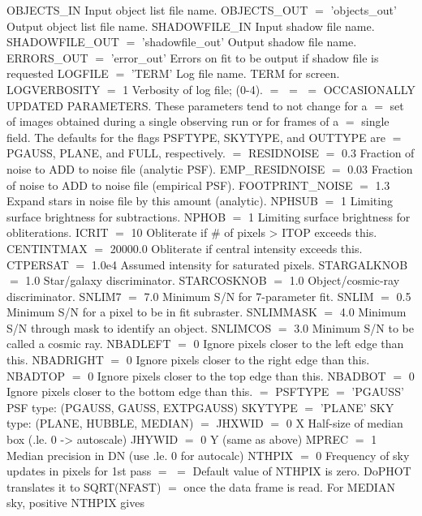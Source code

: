 {{OBJECTS\_IN                           Input object list file name.
OBJECTS\_OUT $=$ 'objects\_out'          Output object list file name.
SHADOWFILE\_IN                        Input shadow file name.
SHADOWFILE\_OUT $=$ 'shadowfile\_out'    Output shadow file name.
ERRORS\_OUT $=$ 'error\_out'  Errors on fit to be output if shadow file is requested
LOGFILE $=$ 'TERM'                     Log file name.  TERM for screen.
LOGVERBOSITY $=$ 1                     Verbosity of log file; (0-4).
$=$
$=$
$=$  OCCASIONALLY UPDATED PARAMETERS.  These parameters tend to not change for a
$=$  set of images obtained during a single observing run or for frames of a
$=$  single field.  The defaults for the flags PSFTYPE, SKYTYPE, and OUTTYPE are
$=$  PGAUSS, PLANE, and FULL, respectively.
$=$
RESIDNOISE $=$ 0.3       Fraction of noise to ADD to noise file (analytic PSF).
EMP\_RESIDNOISE $=$ 0.03  Fraction of noise to ADD to noise file (empirical PSF).
FOOTPRINT\_NOISE $=$ 1.3  Expand stars in noise file by this amount (analytic).
NPHSUB $=$ 1             Limiting surface brightness for subtractions.
NPHOB $=$ 1              Limiting surface brightness for obliterations.
ICRIT $=$ 10             Obliterate if \# of pixels > ITOP exceeds this.
CENTINTMAX $=$ 20000.0   Obliterate if central intensity exceeds this.
CTPERSAT $=$ 1.0e4       Assumed intensity for saturated pixels.
STARGALKNOB $=$ 1.0      Star/galaxy discriminator.
STARCOSKNOB $=$ 1.0      Object/cosmic-ray discriminator.
SNLIM7 $=$ 7.0           Minimum S/N for 7-parameter fit.
SNLIM $=$ 0.5            Minimum S/N for a pixel to be in fit subraster.
SNLIMMASK $=$ 4.0        Minimum S/N through mask to identify an object.
SNLIMCOS  $=$ 3.0        Minimum S/N to be called a cosmic ray.
NBADLEFT $=$ 0           Ignore pixels closer to the left edge than this.
NBADRIGHT $=$ 0          Ignore pixels closer to the right edge than this.
NBADTOP $=$ 0            Ignore pixels closer to the top edge than this.
NBADBOT $=$ 0            Ignore pixels closer to the bottom edge than this.
$=$
PSFTYPE $=$ 'PGAUSS'        PSF type: (PGAUSS, GAUSS, EXTPGAUSS)
SKYTYPE $=$ 'PLANE'         SKY type: (PLANE, HUBBLE, MEDIAN)
$=$
JHXWID $=$ 0              X Half-size of median box (.le. 0 -> autoscale)
JHYWID $=$ 0              Y (same as above)
MPREC $=$ 1               Median precision in DN (use .le. 0 for autocalc)
NTHPIX $=$ 0              Frequency of sky updates in pixels for 1st pass
$=$
$=$ Default value of NTHPIX is zero. DoPHOT translates it to SQRT(NFAST)
$=$ once the data frame is read. For MEDIAN sky, positive NTHPIX gives
}}
